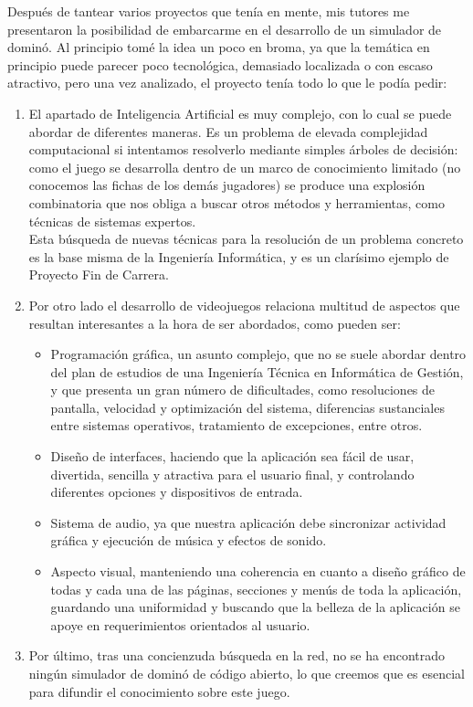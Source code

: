 Después de tantear varios proyectos que tenía en mente, mis tutores me presentaron la posibilidad
de embarcarme en el desarrollo de un simulador de dominó. Al principio tomé la idea un poco en broma,
ya que la temática en principio puede parecer poco tecnológica, demasiado localizada o con escaso
atractivo, pero una vez analizado, el proyecto tenía todo lo que le podía pedir:
\begin{enumerate}
    \item El apartado de Inteligencia Artificial es muy complejo, con lo cual se puede abordar de
            diferentes maneras. Es un
            problema de elevada complejidad computacional si intentamos resolverlo mediante simples
            árboles de decisión: como el juego se desarrolla dentro de un marco de conocimiento
            limitado (no conocemos las fichas de los demás jugadores) se produce una explosión
            combinatoria que nos obliga a buscar otros métodos y herramientas, como técnicas de sistemas expertos.\\
            Esta búsqueda de nuevas técnicas para la resolución de un problema concreto es la base
            misma de la Ingeniería Informática, y es un clarísimo ejemplo de Proyecto Fin de Carrera.
    \item Por otro lado el desarrollo de videojuegos relaciona multitud de aspectos que resultan
            interesantes a la hora de ser abordados, como pueden ser:
            \begin{itemize}
                \item Programación gráfica, un asunto complejo, que no se suele abordar dentro del
                        plan de estudios de una Ingeniería Técnica en Informática de Gestión, y que
                        presenta un gran número de dificultades, como resoluciones de pantalla, velocidad
                        y optimización del sistema, diferencias sustanciales entre sistemas operativos,
                        tratamiento de excepciones, entre otros.
                \item Diseño de interfaces, haciendo que la aplicación sea fácil de usar, divertida,
                        sencilla y atractiva para el usuario final, y controlando diferentes opciones
                        y dispositivos de entrada.
                \item Sistema de audio, ya que nuestra aplicación debe sincronizar actividad gráfica y
                        ejecución de música y efectos de sonido.
                \item Aspecto visual, manteniendo una coherencia en cuanto a diseño gráfico de todas
                        y cada una de las páginas, secciones y menús de toda la aplicación, guardando
                        una uniformidad y buscando que la belleza de la aplicación se apoye en
                        requerimientos orientados al usuario.
            \end{itemize}
    \item Por último, tras una concienzuda búsqueda en la red, no se
      ha encontrado ningún simulador de dominó de código abierto, lo
      que creemos que es esencial para difundir el conocimiento sobre
      este juego.
\end{enumerate}

